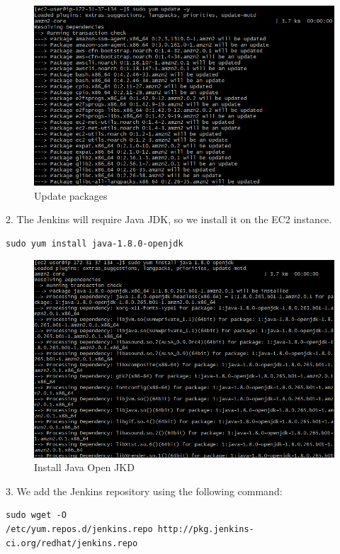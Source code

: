 \documentclass[12pt,a4paper,twoside]{article}
\begin{document}
\begin{figure}[h!]
    \centering
        \includegraphics[width=15cm]{images-aws/15-yum-update.png}
        \caption{Update packages}
\end{figure}


2. The Jenkins will require Java JDK, so we install it on the EC2 instance.

\begin{verbatim}
sudo yum install java-1.8.0-openjdk
\end{verbatim}

\begin{figure}[h!]
    \centering
        \includegraphics[width=15cm]{images-aws/20-install-java.png}
        \caption{Install Java Open JKD}
\end{figure}

3. We add the Jenkins repository using the following command:

\begin{verbatim}
sudo wget -O
/etc/yum.repos.d/jenkins.repo http://pkg.jenkins-
ci.org/redhat/jenkins.repo
\end{verbatim}
\end{document}
